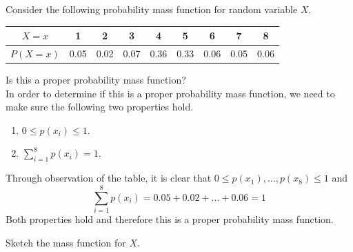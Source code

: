 \begin{example}
Consider the following probability mass function for random variable $X$.

\begin{center}
\begin{tabular}{c|c|c|c|c|c|c|c|c}
\def\arraystretch{1.5}
$X=x$ & 1 & 2 & 3 & 4 & 5 & 6 & 7 & 8 \\ 
\hline 
$P(X=x)$ & 0.05 & 0.02 & 0.07 & 0.36 & 0.33 & 0.06 & 0.05 & 0.06 \\ 
\end{tabular} 

\begin{benumerate}
\item Is this a proper probability mass function?\\

In order to determine if this is a proper probability mass function, we need to make sure the following two properties hold.
\begin{enumerate}[1.]
\item $0 \leq p(x_i) \leq 1$.
\item $\sum_{i=1}^{8} p(x_i) = 1$.
\end{enumerate}

Through observation of the table, it is clear that $0 \leq p(x_1), \hdots , p(x_8) \leq 1$ and
\[ \sum_{i=1}^{8} p(x_i) = 0.05 + 0.02 + \hdots + 0.06 = 1 \] 
Both properties hold and therefore this is a proper probability mass function.

\item	Sketch the mass function for $X$.
\item[]	\begin{center}
		\end{center}



\end{benumerate}
\end{center}
\end{example}
